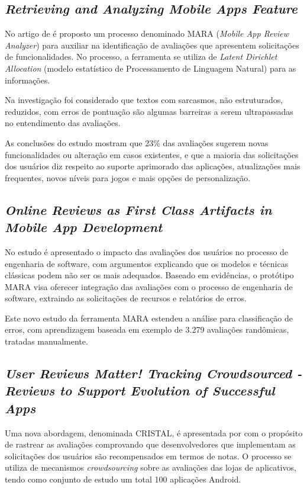 \subsection{\textit{Retrieving and Analyzing Mobile Apps Feature}}

No artigo de  é proposto um processo denominado MARA (\textit{Mobile App Review Analyzer}) para auxiliar na identificação de avaliações que apresentem solicitações de funcionalidades. No processo, a ferramenta se utiliza de \textit{Latent Dirichlet Allocation} (modelo estatístico de Processamento de Linguagem Natural) para as informações.

Na investigação foi considerado que textos com sarcasmos, não estruturados, reduzidos, com erros de pontuação são algumas barreiras a serem ultrapassadas no entendimento das avaliações.

As conclusões do estudo mostram que 23\% das avaliações sugerem novas funcionalidades ou alteração em casos existentes, e que a maioria das solicitações dos usuários diz respeito ao suporte aprimorado das aplicações, atualizações mais frequentes, novos níveis para jogos e mais opções de personalização.

\subsection{\textit{Online Reviews as First Class Artifacts in Mobile App Development}}

No estudo  é apresentado o impacto das avaliações dos usuários no processo de engenharia de software, com argumentos explicando que os modelos e técnicas clássicas podem não ser os mais adequados. Baseado em evidências, o protótipo MARA visa oferecer integração das avaliações com o processo de engenharia de software, extraindo as solicitações de recursos e relatórios de erros.

Este novo estudo da ferramenta MARA estendeu a análise para classificação de erros, com aprendizagem baseada em exemplo de 3.279 avaliações randômicas, tratadas manualmente.

\subsection{\textit{User Reviews Matter! Tracking Crowdsourced - Reviews to Support Evolution of Successful Apps}}

Uma nova abordagem, denominada CRISTAL, é apresentada por   com o propósito de rastrear as avaliações comprovando que desenvolvedores que implementam as solicitações dos usuários são recompensados em termos de notas. O processo se utiliza de mecanismos \textit{crowdsourcing} sobre as avaliações das lojas de aplicativos, tendo como conjunto de estudo um total 100 aplicações Android.

